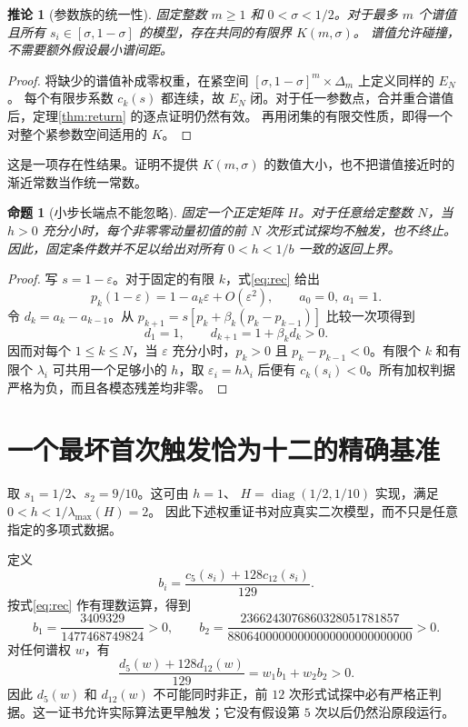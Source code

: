 \documentclass[11pt,a4paper,UTF8,fontset=fandol]{ctexart}
\newtheorem{proposition}[theorem]{命题}
\newtheorem{corollary}[theorem]{推论}
\theoremstyle{remark}\newtheorem{remark}[theorem]{说明}
\newcommand{\diag}{\operatorname{diag}}
\begin{document}
\begin{corollary}[参数族的统一性]\label{cor:family}
固定整数 $m\ge1$ 和 $0<\sigma<1/2$。对于最多 $m$ 个谱值且所有
$s_i\in[\sigma,1-\sigma]$ 的模型，存在共同的有限界 $K(m,\sigma)$。
谱值允许碰撞，不需要额外假设最小谱间距。
\end{corollary}
\begin{proof}
将缺少的谱值补成零权重，在紧空间
$[\sigma,1-\sigma]^m\times\Delta_m$ 上定义同样的 $E_N$。
每个有限步系数 $c_k(s)$ 都连续，故 $E_N$ 闭。对于任一参数点，合并重合谱值后，定理\ref{thm:return} 的逐点证明仍然有效。
再用闭集的有限交性质，即得一个对整个紧参数空间适用的 $K$。
\end{proof}

这是一项存在性结果。证明不提供 $K(m,\sigma)$ 的数值大小，也不把谱值接近时的渐近常数当作统一常数。

\begin{proposition}[小步长端点不能忽略]\label{prop:small-h}
固定一个正定矩阵 $H$。对于任意给定整数 $N$，当 $h>0$ 充分小时，每个非零零动量初值的前 $N$ 次形式试探均不触发，也不终止。因此，固定条件数并不足以给出对所有 $0<h<1/b$ 一致的返回上界。
\end{proposition}
\begin{proof}
写 $s=1-\varepsilon$。对于固定的有限 $k$，式\eqref{eq:rec} 给出
\[
 p_k(1-\varepsilon)=1-a_k\varepsilon+O(\varepsilon^2),
 \qquad a_0=0,\ a_1=1.
\]
令 $d_k=a_k-a_{k-1}$。从
$p_{k+1}=s[p_k+\beta_k(p_k-p_{k-1})]$ 比较一次项得到
\[
 d_1=1,\qquad d_{k+1}=1+\beta_k d_k>0.
\]
因而对每个 $1\le k\le N$，当 $\varepsilon$ 充分小时，$p_k>0$ 且
$p_k-p_{k-1}<0$。有限个 $k$ 和有限个 $\lambda_i$ 可共用一个足够小的
$h$，取 $\varepsilon_i=h\lambda_i$ 后便有 $c_k(s_i)<0$。所有加权判据严格为负，而且各模态残差均非零。
\end{proof}

\section{一个最坏首次触发恰为十二的精确基准}
取 $s_1=1/2$、$s_2=9/10$。这可由 $h=1$、
$H=\diag(1/2,1/10)$ 实现，满足 $0<h<1/\lambda_{\max}(H)=2$。
因此下述权重证书对应真实二次模型，而不只是任意指定的多项式数据。

定义
\[
 b_i=\frac{c_5(s_i)+128c_{12}(s_i)}{129}.
\]
按式\eqref{eq:rec} 作有理数运算，得到
\begin{equation}\label{eq:dual}
 b_1=\frac{3409329}{1477468749824}>0,\qquad
 b_2=\frac{2366243076860328051781857}
 {88064000000000000000000000000}>0.
\end{equation}
对任何谱权 $w$，有
\[
 \frac{d_5(w)+128d_{12}(w)}{129}=w_1b_1+w_2b_2>0.
\]
因此 $d_5(w)$ 和 $d_{12}(w)$ 不可能同时非正，前 $12$ 次形式试探中必有严格正判据。这一证书允许实际算法更早触发；它没有假设第 $5$ 次以后仍然沿原段运行。
\end{document}

